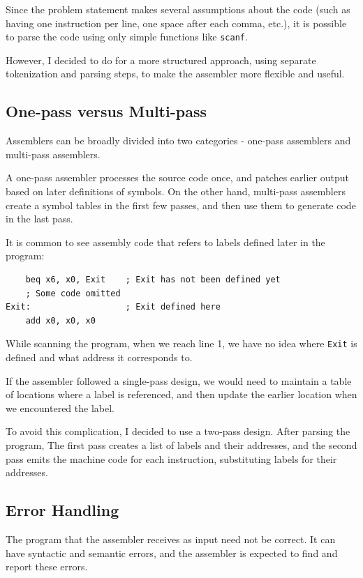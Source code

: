 \documentclass{article}
\begin{document}
Since the problem statement makes several assumptions about the code (such
as having one instruction per line, one space after each comma, etc.), it is possible
to parse the code using only simple functions like \texttt{scanf}.

However, I decided to do for a more structured approach, using separate tokenization
and parsing steps, to make the assembler more flexible and useful.

\subsection{One-pass versus Multi-pass}

Assemblers can be broadly divided into two categories - one-pass assemblers and
multi-pass assemblers.

A one-pass assembler processes the source code once, and patches earlier output
based on later definitions of symbols. On the other hand, multi-pass assemblers
create a symbol tables in the first few passes, and then use them to generate code in the 
last pass.

It is common to see assembly code that refers to labels defined later in the program:

\begin{verbatim}
    beq x6, x0, Exit    ; Exit has not been defined yet
    ; Some code omitted
Exit:                   ; Exit defined here
    add x0, x0, x0
\end{verbatim}

While scanning the program, when we reach line 1, we have no idea where \texttt{Exit}
is defined and what address it corresponds to.

If the assembler followed a single-pass design, we would need to maintain a table of locations
where a label is referenced, and then update the earlier location when we encountered the label.

To avoid this complication, I decided to use a two-pass design. After parsing the program,
The first pass creates a list of labels and their addresses, and the second pass emits
the machine code for each instruction, substituting labels for their addresses. 

\subsection{Error Handling}

The program that the assembler receives as input need not be correct. It can have syntactic
and semantic errors, and the assembler is expected to find and report these errors.
\end{document}
